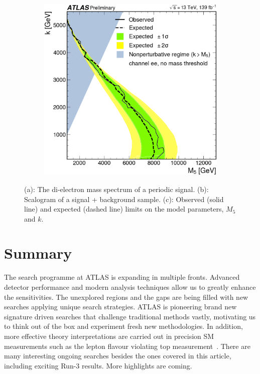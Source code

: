 \documentclass{moriond}
\begin{document}
\begin{figure}[htp]
\begin{subfigure}[b]{0.30\textwidth}
         \caption{}
         \label{fig:shape}
     \end{subfigure}
     \begin{subfigure}[b]{0.30\textwidth}
         \centering
         \includegraphics[width=\textwidth]{periodic}
         \caption{}
         \label{fig:perlimits}
     \end{subfigure}
        \caption{(a): The di-electron mass spectrum of a periodic signal. (b): Scalogram of a signal + background sample. (c): Observed (solid line) and expected (dashed line) limits on the model parameters, $M_{5}$ and $k$\protect\cite{period}.}
        \label{fig:periodic}
\end{figure}

\vspace{-0.5cm}

\section{Summary}

The search programme at ATLAS is expanding in multiple fronts. Advanced
detector performance and modern analysis techniques allow us to greatly enhance
the sensitivities. The unexplored regions and the gaps are being filled with
new searches applying unique search strategies. ATLAS is pioneering brand new
signature driven searches that challenge traditional methods vastly, motivating
us to think out of the box and experiment fresh new methodologies. In addition,
more effective theory interpretations are carried out in precision SM
measurements such as the lepton flavour violating top measurement~\cite{top}.
There are many interesting ongoing searches besides the ones covered in this
article, including exciting Run-3 results. More highlights are coming.       
\end{document}
